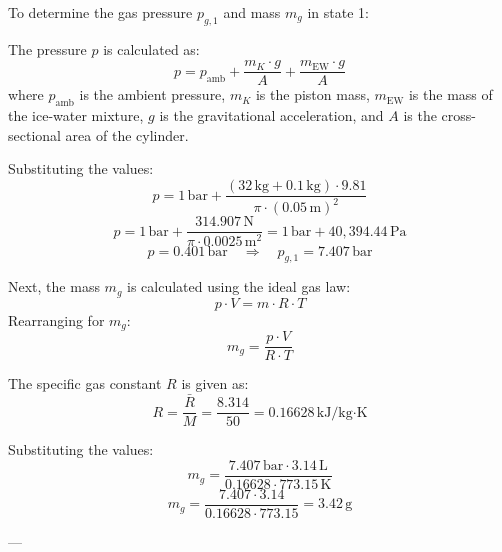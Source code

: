 To determine the gas pressure \( p_{g,1} \) and mass \( m_g \) in state 1:  

The pressure \( p \) is calculated as:  
\[
p = p_{\text{amb}} + \frac{m_K \cdot g}{A} + \frac{m_{\text{EW}} \cdot g}{A}
\]  
where \( p_{\text{amb}} \) is the ambient pressure, \( m_K \) is the piston mass, \( m_{\text{EW}} \) is the mass of the ice-water mixture, \( g \) is the gravitational acceleration, and \( A \) is the cross-sectional area of the cylinder.  

Substituting the values:  
\[
p = 1 \, \text{bar} + \frac{(32 \, \text{kg} + 0.1 \, \text{kg}) \cdot 9.81}{\pi \cdot (0.05 \, \text{m})^2}
\]  
\[
p = 1 \, \text{bar} + \frac{314.907 \, \text{N}}{\pi \cdot 0.0025 \, \text{m}^2} = 1 \, \text{bar} + 40,394.44 \, \text{Pa}
\]  
\[
p = 0.401 \, \text{bar} \quad \Rightarrow \quad p_{g,1} = 7.407 \, \text{bar}
\]  

Next, the mass \( m_g \) is calculated using the ideal gas law:  
\[
p \cdot V = m \cdot R \cdot T
\]  
Rearranging for \( m_g \):  
\[
m_g = \frac{p \cdot V}{R \cdot T}
\]  

The specific gas constant \( R \) is given as:  
\[
R = \frac{\bar{R}}{M} = \frac{8.314}{50} = 0.16628 \, \text{kJ/kg·K}
\]  

Substituting the values:  
\[
m_g = \frac{7.407 \, \text{bar} \cdot 3.14 \, \text{L}}{0.16628 \cdot 773.15 \, \text{K}}
\]  
\[
m_g = \frac{7.407 \cdot 3.14}{0.16628 \cdot 773.15} = 3.42 \, \text{g}
\]  

---